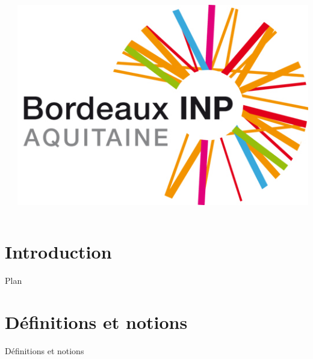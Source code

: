 \documentclass[10pt]{beamer}
\begin{document}
\begin{frame}{}
\begin{columns}
\begin{column}{0.22\textwidth}
        \end{column}
        \begin{column}{0.22\textwidth}
            \includegraphics[width=\linewidth]{../media/logo_inp.jpg}
        \end{column}
    \end{columns}
    \titlepage
\end{frame}

\section{Introduction}

\begin{frame}{Plan}
    \tableofcontents[ 
        sectionstyle=show, 
        subsectionstyle=show, 
        currentsubsection, 
        hideothersubsections, 
    ] 
\end{frame}





\section{Définitions et notions}

\begin{frame}{Définitions et notions}
    \tableofcontents[ 
        sectionstyle=show/shaded, 
        subsectionstyle=show/shaded, 
        currentsubsection, 
        hideothersubsections, 
    ] 
\end{frame}



%


\end{document}
